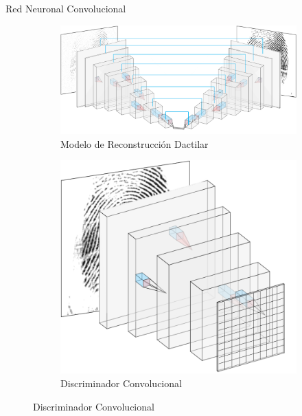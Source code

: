 \documentclass[12pt,aspectratio=169]{beamer}
\begin{document}
\begin{frame}{Red Neuronal Convolucional}

   \begin{figure}
        \begin{subfigure}{0.62\textwidth}
            \centering
            \includegraphics[scale=0.34]{figs/layers_nn_u.PNG}
            \caption{Modelo de Reconstrucción Dactilar}
        \end{subfigure}
        \begin{subfigure}{0.36\textwidth}
            \centering
            \includegraphics[scale=0.25]{figs/disc_cuad.png}
            \caption{Discriminador Convolucional}
        \end{subfigure}
    \end{figure}

\end{frame}
\end{document}
